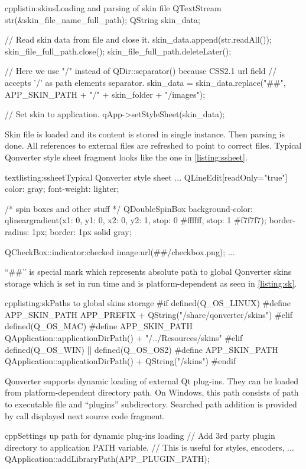 \begin{fdoccode}{cpp}{listin:skins}{Loading and parsing of skin file}
QTextStream str(&skin_file_name_full_path);
QString skin_data;

// Read skin data from file and close it.
skin_data.append(str.readAll());
skin_file_full_path.close();
skin_file_full_path.deleteLater();

// Here we use "/" instead of QDir::separator() because CSS2.1 url field
// accepts '/' as path elements separator.
skin_data = skin_data.replace("##",
			APP_SKIN_PATH + "/" + skin_folder + "/images");

// Set skin to application.
qApp->setStyleSheet(skin_data);
\end{fdoccode}

Skin file is loaded and its content is stored in single instance. Then parsing is done. All references to external files are refreshed to point to correct files. Typical Qonverter style sheet fragment looks like the one in \autoref{listing:ssheet}.

\begin{fdoccode}{text}{listing:ssheet}{Typical Qonverter style sheet}
...
QLineEdit[readOnly="true"] {
    color: gray;
    font-weight: lighter;
}

/* spin boxes and other stuff */
QDoubleSpinBox {
    background-color: qlineargradient(x1: 0, y1: 0, x2: 0, y2: 1, stop: 0 #ffffff, stop: 1 #f7f7f7);
    border-radius: 1px;
	border: 1px solid gray;
}

QCheckBox::indicator:checked {
    image:url(##/checkbox.png);
}
...
\end{fdoccode}

\enquote{\#\#} is special mark which represents absolute path to global Qonverter skins storage which is set in run time and is platform-dependent as seen in \autoref{listing:sk}.

\begin{fdoccode}{cpp}{listing:sk}{Paths to global skins storage}
#if defined(Q_OS_LINUX)
#define	APP_SKIN_PATH APP_PREFIX + QString("/share/qonverter/skins")
#elif defined(Q_OS_MAC)
#define	APP_SKIN_PATH QApplication::applicationDirPath() + "/../Resources/skins"
#elif defined(Q_OS_WIN) || defined(Q_OS_OS2)
#define	APP_SKIN_PATH QApplication::applicationDirPath() + QString("/skins")
#endif
\end{fdoccode}

Qonverter supports dynamic loading of external Qt plug-ins. They can be loaded from platform-dependent directory path. On Windows, this path consists of path to executable file and \enquote{plugins} subdirectory. Searched path addition is provided by call displayed next source code fragment.
\begin{fdoccode}{cpp}{}{Settings up path for dynamic plug-ins loading}
// Add 3rd party plugin directory to application PATH variable.
// This is useful for styles, encoders, ...
QApplication::addLibraryPath(APP_PLUGIN_PATH);
\end{fdoccode}

